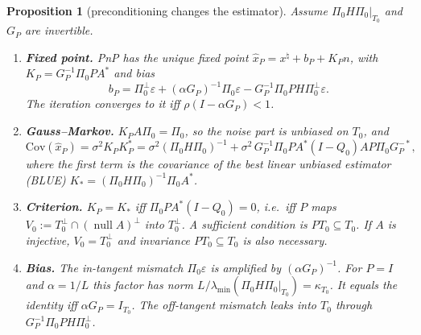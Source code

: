 \documentclass[11pt]{article}
\newtheorem{proposition}[theorem]{Proposition}
\theoremstyle{definition}
\theoremstyle{remark}
\newcommand{\nul}{\operatorname{null}}
\newcommand{\lmin}{\lambda_{\min}}
\newcommand{\xt}{x^\natural}
\begin{document}
\begin{proposition}[preconditioning changes the estimator]\label{prop:estimator}
Assume $\Pi_0H\Pi_0|_{T_0}$ and $G_P$ are invertible.
\begin{enumerate}
\item \textbf{Fixed point.} PnP has the unique fixed point $\hat x_P=\xt+b_P+K_Pn$, with $K_P=G_P^{-1}\Pi_0PA^*$ and
  bias
  \begin{equation}\label{eq:bias}
  b_P=\Pi_0^\perp\varepsilon+(\alpha G_P)^{-1}\Pi_0\varepsilon-G_P^{-1}\Pi_0PH\Pi_0^\perp\varepsilon .
  \end{equation}
  The iteration converges to it iff $\rho(I-\alpha G_P)<1$.
\item \textbf{Gauss--Markov.} $K_PA\Pi_0=\Pi_0$, so the noise part is unbiased on $T_0$, and
  \[
  \mathrm{Cov}(\hat x_P)=\sigma^2K_PK_P^*=\sigma^2(\Pi_0H\Pi_0)^{-1}+\sigma^2\,G_P^{-1}\Pi_0PA^*(I-Q_0)AP\Pi_0G_P^{-*},
  \]
  where the first term is the covariance of the best linear unbiased estimator (BLUE) $K_*=(\Pi_0H\Pi_0)^{-1}\Pi_0A^*$.
\item \textbf{Criterion.} $K_P=K_*$ iff $\Pi_0PA^*(I-Q_0)=0$, i.e.\ iff $P$ maps
  $V_0:=T_0^\perp\cap(\nul A)^\perp$ into $T_0^\perp$. A sufficient condition is $PT_0\subseteq T_0$. If $A$ is
  injective, $V_0=T_0^\perp$ and invariance $PT_0\subseteq T_0$ is also necessary.
\item \textbf{Bias.} The in-tangent mismatch $\Pi_0\varepsilon$ is amplified by $(\alpha G_P)^{-1}$. For $P=I$ and
  $\alpha=1/L$ this factor has norm $L/\lmin(\Pi_0H\Pi_0|_{T_0})=\kappa_{T_0}$. It equals the identity iff
  $\alpha G_P=I_{T_0}$. The off-tangent mismatch leaks into $T_0$ through $G_P^{-1}\Pi_0PH\Pi_0^\perp$.
\end{enumerate}
\end{proposition}
\end{document}
